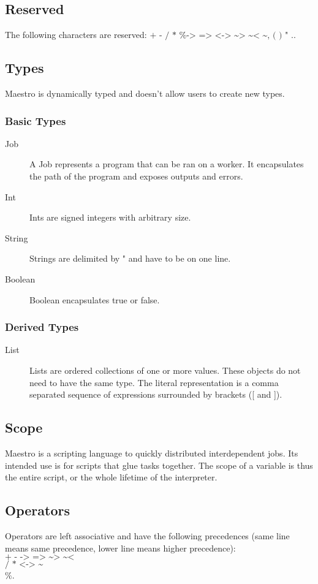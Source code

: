 \documentclass[12pt]{article}
\begin{document}
\subsection{Reserved}
The following characters are reserved: $\texttt{+ - / * \% -> => <-> \textasciitilde>
\textasciitilde< \textasciitilde , ( ) " .}$.

\subsection{Types}
Maestro is dynamically typed and doesn't allow users to create new types.
\subsubsection{Basic Types}
\begin{description}
  \item[Job] A Job represents a program that can be ran on a worker. It encapsulates
    the path of the program and exposes outputs and errors.
  \item[Int] Ints are signed integers with arbitrary size.
  \item[String] Strings are delimited by " and have to be on one line.
  \item[Boolean] Boolean encapsulates true or false.
\end{description}

\subsubsection{Derived Types}
\begin{description}
  \item[List] Lists are ordered collections of one or more values. These
    objects do not need to have the same type. The literal representation is a
    comma separated sequence of expressions surrounded by brackets ([ and ]).
\end{description}

\subsection{Scope}
Maestro is a scripting language to quickly distributed interdependent jobs. Its
intended use is for scripts that glue tasks together. The scope of a variable
is thus the entire script, or the whole lifetime of the interpreter.

\subsection{Operators}
Operators are left associative and have the following precedences (same line
means same precedence, lower line means higher precedence):\\
$\texttt{+ - -> => \textasciitilde> \textasciitilde<}$\\
$\texttt{/ * <-> \textasciitilde}$\\
$\texttt{\%}$.
\end{document}
